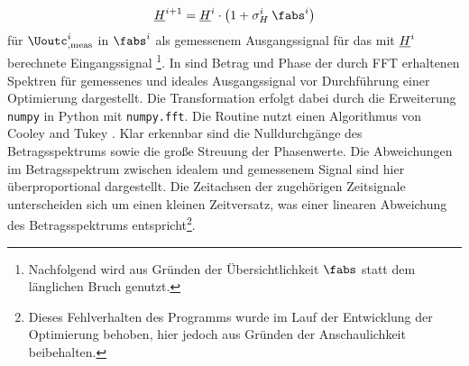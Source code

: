 \documentclass[../Report.tex]{subfiles}
\begin{document}
\begin{align}
\label{eq:opt.Hnew}
	\Hcompl^{i+1}
		=\Hcompl^{i} \cdot
		\left( 1 + \sigma_H^i \: \fabs^{i}	\right)					 
\end{align}
für $\Uoutc_{, \mathrm{meas}}^{i}$ in $\fabs^{i}$ als gemessenem Ausgangssignal für das mit $\underline{H}^{i}$ berechnete Eingangssignal
\footnote{Nachfolgend wird aus Gründen der Übersichtlichkeit $\fabs$ statt dem länglichen Bruch genutzt.}.
In  sind Betrag und Phase der durch FFT erhaltenen Spektren für gemessenes und ideales Ausgangssignal vor Durchführung einer Optimierung dargestellt. Die Transformation erfolgt dabei durch die Erweiterung \lstinline{numpy} in Python mit \lstinline{numpy.fft}. Die Routine nutzt einen Algorithmus von Cooley and Tukey \cite[S. 297-301]{cooley65}.
Klar erkennbar sind die Nulldurchgänge des Betragsspektrums sowie die große Streuung der Phasenwerte. Die Abweichungen im Betragsspektrum zwischen idealem und gemessenem Signal sind hier überproportional dargestellt. Die Zeitachsen der zugehörigen Zeitsignale unterscheiden sich um einen kleinen Zeitversatz, was einer linearen Abweichung des Betragsspektrums entspricht\footnote{Dieses Fehlverhalten des Programms wurde im Lauf der Entwicklung der Optimierung behoben, hier jedoch aus Gründen der Anschaulichkeit beibehalten.}.
\\

 \absSpectIdeal 
{} \absSpectMeas
{} \angleSpectIdeal 
{} \angleSpectMeas 
\end{document}
